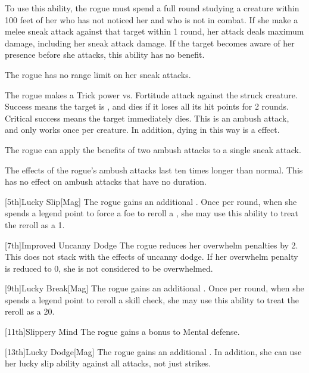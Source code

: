         To use this ability, the rogue must spend a full round studying a creature within 100 feet of her who has not noticed her and who is not in combat.
        If she make a melee sneak attack against that target within 1 round, her attack deals maximum damage, including her sneak attack damage.
        If the target becomes aware of her presence before she attacks, this ability has no benefit.

        The rogue has no range limit on her sneak attacks.

        The rogue makes a Trick power vs. Fortitude attack against the struck creature.
        Success means the target is \staggered, and dies if it loses all its hit points for 2 rounds.
        Critical success means the target immediately dies.
        This is an ambush attack, and only works once per creature.
        In addition, dying in this way is a  effect.

        The rogue can apply the benefits of two ambush attacks to a single sneak attack.

        The effects of the rogue's ambush attacks last ten times longer than normal.
        This has no effect on ambush attacks that have no duration.

        [5th]{Lucky Slip}[Mag]
        The rogue gains an additional .
        Once per round, when she spends a legend point to force a foe to reroll a , she may use this ability to treat the reroll as a 1.

        [7th]{Improved Uncanny Dodge}
        The rogue reduces her overwhelm penalties by 2.
        This does not stack with the effects of uncanny dodge.
        If her overwhelm penalty is reduced to 0, she is not considered to be overwhelmed.

        [9th]{Lucky Break}[Mag]
        The rogue gains an additional .
        Once per round, when she spends a legend point to reroll a skill check, she may use this ability to treat the reroll as a 20.

        [11th]{Slippery Mind}
        The rogue gains a  bonus to Mental defense.

        [13th]{Lucky Dodge}[Mag]
        The rogue gains an additional .
        In addition, she can use her lucky slip ability against all attacks, not just strikes.

